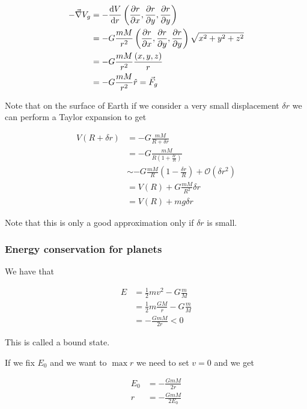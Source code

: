 \documentclass[10pt]{extarticle}
\begin{document}
\begin{align*}
    - \vec \nabla V_g & = - \dv{V}{r} \left(\pdv{r}{x},\pdv{r}{y},\pdv{r}{y} \right)                                \\
                      & = - G \frac{m M}{r^2} \left(\pdv{r}{x},\pdv{r}{y},\pdv{r}{y} \right) \sqrt{x^2 + y^2 + z^2} \\
                      & = - G \frac{m M}{r^2} \frac{(x, y, z)}{r}                                                   \\
                      & = - G \frac{m M}{r^2} \hat r = \vec F_g
\end{align*}

Note that on the surface of Earth if we consider a very small displacement $\delta r$ we can perform a Taylor expansion to get

\begin{align*}
    V(R + \delta r) & = - G \frac{m M}{R + \delta r}                                            \\
                    & = - G \frac{m M}{R (1 + \frac{\delta r}{R})}                              \\
                    & \sim - G \frac{m M}{R} (1 - \frac{\delta r}{R}) + \mathcal{O}(\delta r^2) \\
                    & = V(R) + G \frac{m M}{R^2} \delta r                                       \\
                    & = V(R) + m g \delta r
\end{align*}

Note that this is only a good approximation only if $\delta r$ is small.

\subsubsection{Energy conservation for planets}

We have that

\begin{align*}
    E & = \frac{1}{2} m v^2 - G \frac{m}{M}           \\
      & = \frac{1}{2} m \frac{G M}{r} - G \frac{m}{M} \\
      & = - \frac{G m M}{2 r} < 0
\end{align*}

This is called a bound state.

If we fix $E_0$ and we want to $\max r$ we need to set $v = 0$ and we get

\begin{align*}
    E_0 & = - \frac{G m M}{2 r}   \\
    r   & = - \frac{G m M}{2 E_0}
\end{align*}
\end{document}
